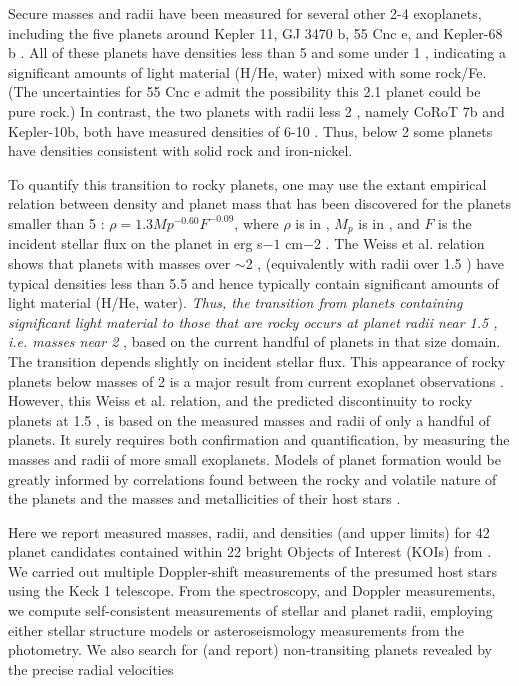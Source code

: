 \documentclass{emulateapj}
\begin{document}
Secure masses and radii have been measured for several other 2-4
\rearth exoplanets, including the five planets around Kepler 11, GJ
3470 b, 55 Cnc e, and Kepler-68 b \citep{Lissauer2013, Bonfils2012,
  Demory2013, Demory2011, Gilliland2013}. All of these planets have
densities less than 5 \gcc and some under 1 \gcc, indicating a
significant amounts of light material (H/He, water) mixed with some
rock/Fe.  (The uncertainties for 55 Cnc e admit the possibility this
2.1 \rearth planet could be pure rock.)  In contrast, the two planets
with radii less 2 \rearthe, namely CoRoT 7b and Kepler-10b, both have
measured densities of 6-10 \gcc \citep{Queloz2009, Batalha2011}.
Thus, below 2 \rearth some planets have densities consistent with
solid rock and iron-nickel.

To quantify this transition to rocky planets, one may use the extant
empirical relation between density and planet mass that has been
discovered for the planets smaller than 5 \rearthe: $\rho = 1.3
Mp^{-0.60} F^{-0.09}$, where $\rho$ is in \gcc, $M_p$ is in \mearth,
and $F$ is the incident stellar flux on the planet in erg s$-1$
cm${-2}$ \citep{Weiss2013}.  The Weiss et al. relation shows that
planets with masses over $\sim$2 \mearth, (equivalently with radii
over 1.5 \rearthe) have typical densities less than 5.5 \gcc and hence
typically contain significant amounts of light material (H/He, water).
{\it Thus, the transition from planets containing significant light
  material to those that are rocky occurs at planet radii near 1.5
  \rearthe, i.e. masses near 2 \mearth}, based on the current handful
of planets in that size domain.  The transition depends slightly on
incident stellar flux.  This appearance of rocky planets below masses
of 2 \mearth is a major result from current \ek exoplanet observations
\citep{Weiss2013}.  However, this Weiss et al. relation, and the
predicted discontinuity to rocky planets at 1.5 \rearthe, is based on
the measured masses and radii of only a handful of planets.  It surely
requires both confirmation and quantification, by measuring the masses
and radii of more small exoplanets.  Models of planet formation would
be greatly informed by correlations found between the rocky and volatile
nature of the planets and the masses and metallicities of their host
stars \citep{Buchhave2012, Latham2012, Johnson2007}.

Here we report measured masses, radii, and densities (and upper
limits) for 42 planet candidates contained within 22 bright \ek
Objects of Interest (KOIs) from \cite{Batalha2013}.  We carried out
multiple Doppler-shift measurements of the presumed host stars using
the Keck 1 telescope.  From the spectroscopy, and Doppler
measurements, we compute self-consistent measurements of stellar and
planet radii, employing either stellar structure models or
asteroseismology measurements from the \ek photometry.  We also search
for (and report) non-transiting planets revealed by the precise radial
velocities
\end{document}
